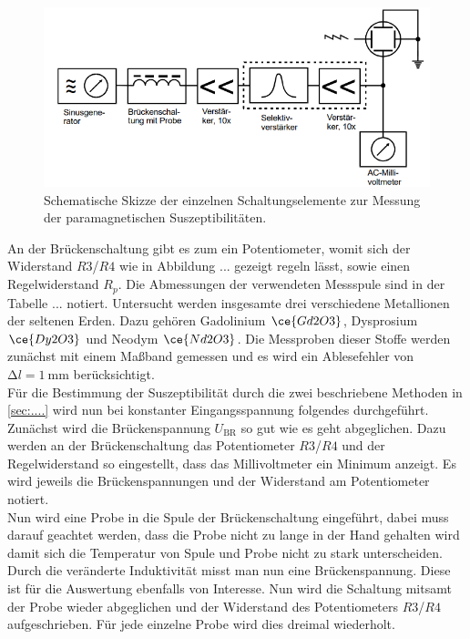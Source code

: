 \begin{figure}
    \centering
    \includegraphics[width=\textwidth]{bilder/aufbaumessung.png}
    \caption{Schematische Skizze der einzelnen Schaltungselemente zur Messung der paramagnetischen Suszeptibilitäten. \cite{skript}} 
    \label{fig:aufbaumessung}
\end{figure}

An der Brückenschaltung gibt es zum ein Potentiometer, womit sich der Widerstand $R3$/$R4$ wie in Abbildung ... gezeigt regeln lässt, sowie einen Regelwiderstand $R_{p}$. Die Abmessungen der verwendeten Messspule sind in der Tabelle ... notiert. 
Untersucht werden insgesamte drei verschiedene Metallionen der seltenen Erden. Dazu gehören Gadolinium $\ce{Gd2O3}$, Dysprosium $\ce{Dy2O3}$ und Neodym $\ce{Nd2O3}$. Die Messproben dieser Stoffe werden zunächst mit einem Maßband gemessen und es wird ein Ablesefehler von
$\increment l= \SI{1}{\milli\meter}$ berücksichtigt. 
\\
\newline
Für die Bestimmung der Suszeptibilität durch die zwei beschriebene Methoden in \ref{sec:....} wird nun bei konstanter Eingangsspannung folgendes durchgeführt. 
Zunächst wird die Brückenspannung $U_{\text{BR}}$ so gut wie es geht abgeglichen. Dazu werden an der Brückenschaltung das Potentiometer $R3$/$R4$ und der Regelwiderstand so eingestellt, dass das Millivoltmeter ein Minimum anzeigt. Es wird jeweils die Brückenspannungen und der
Widerstand am Potentiometer notiert. 
\\
Nun wird eine Probe in die Spule der Brückenschaltung eingeführt, dabei muss darauf geachtet werden, dass die Probe nicht zu lange in der Hand gehalten wird damit sich die Temperatur von Spule und Probe nicht zu stark unterscheiden. Durch die 
veränderte Induktivität misst man nun eine Brückenspannung. Diese ist für die Auswertung ebenfalls von Interesse. Nun wird die Schaltung mitsamt der Probe wieder abgeglichen und der Widerstand des Potentiometers $R3$/$R4$ aufgeschrieben. Für
jede einzelne Probe wird dies dreimal wiederholt.